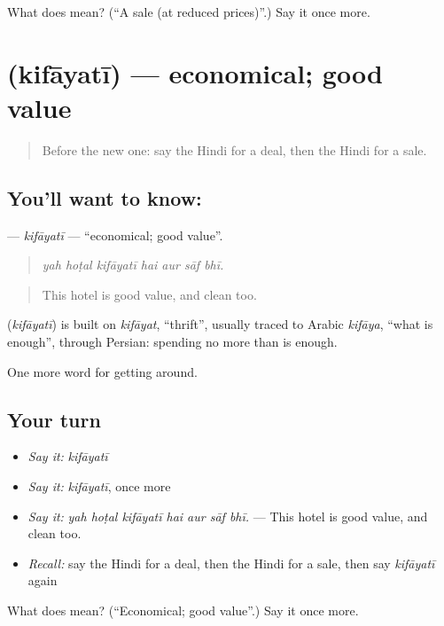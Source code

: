 \begin{tcolorbox}[breakable,colback=teal!4,colframe=teal!35!black,title={Before you move on}]
What does  mean? (\textquotedblleft{}A sale (at reduced prices)\textquotedblright{}.) Say it once more.
\end{tcolorbox}
\section[\texorpdfstring{\hi{किफ़ायती} (kifāyatī)}{किफ़ायती (kifāyatī)}]{ (kifāyatī) — economical; good value}

\label{lesson:HI-C431-kifayati}



\begin{quote}
Before the new one: say the Hindi for a deal, then the Hindi for a sale.
\end{quote}

\subsection*{You'll want to know: }
\textbf{} — \emph{kifāyatī} — \textquotedblleft{}economical; good value\textquotedblright{}.

\begin{quote}
      
\end{quote}

\begin{quote}
\emph{yah hoṭal kifāyatī hai aur sāf bhī.}
\end{quote}

\begin{quote}
This hotel is good value, and clean too.
\end{quote}

\begin{cousinweb}
\textbf{} (\emph{kifāyatī}) is built on \emph{kifāyat}, \textquotedblleft{}thrift\textquotedblright{}, usually traced to Arabic \emph{kifāya}, \textquotedblleft{}what is enough\textquotedblright{}, through Persian: spending no more than is enough.
\end{cousinweb}

\begin{grammarlens}[title={What you've built}]
One more word for getting around.
\end{grammarlens}

\subsection*{Your turn}
\begin{itemize}
\raggedright
  \item \emph{Say it:} \emph{kifāyatī}
  \item \emph{Say it:} \emph{kifāyatī}, once more
  \item \emph{Say it:} \emph{yah hoṭal kifāyatī hai aur sāf bhī.} — This hotel is good value, and clean too.
  \item \emph{Recall:} say the Hindi for a deal, then the Hindi for a sale, then say \emph{kifāyatī} again
\end{itemize}

\begin{tcolorbox}[breakable,colback=teal!4,colframe=teal!35!black,title={Before you move on}]
What does  mean? (\textquotedblleft{}Economical; good value\textquotedblright{}.) Say it once more.
\end{tcolorbox}
